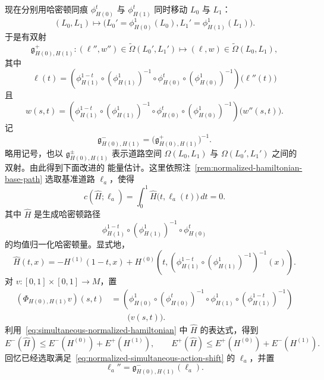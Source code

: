 现在分别用哈密顿同痕 $\phi_{H(0)}^t$ 与 $\phi_{H(1)}^t$ 同时移动
$L_0$ 与 $L_1$：
\[
  (L_0,L_1)
  \longmapsto
  \bigl(
    L_0'=\phi_{H(0)}^1(L_0),
    L_1'=\phi_{H(1)}^1(L_1)
  \bigr).
\]
于是有双射
\[
  \mathfrak g_{H(0),H(1)}^+:
  (\ell'',w'')
  \in\widetilde\Omega(L_0',L_1')
  \longmapsto
  (\ell,w)
  \in\widetilde\Omega(L_0,L_1),
\]
其中
\[
  \ell(t)
  =
  \left(
    \phi_{H(1)}^{1-t}
    \circ(\phi_{H(1)}^1)^{-1}
    \circ\phi_{H(0)}^t
    \circ(\phi_{H(0)}^1)^{-1}
  \right)
  \bigl(\ell''(t)\bigr)
\]
且
\[
  w(s,t)
  =
  \left(
    \phi_{H(1)}^{1-t}
    \circ(\phi_{H(1)}^1)^{-1}
    \circ\phi_{H(0)}^t
    \circ(\phi_{H(0)}^1)^{-1}
  \right)
  \bigl(w''(s,t)\bigr).
\]
记
\[
  \mathfrak g_{H(0),H(1)}^-
  =
  \bigl(\mathfrak g_{H(0),H(1)}^+\bigr)^{-1}.
\]
略用记号，也以 $\mathfrak g_{H(0),H(1)}^\pm$ 表示道路空间
$\Omega(L_0,L_1)$ 与 $\Omega(L_0',L_1')$ 之间的双射。由此得到下面改进的
能量估计。这里依照注~\ref{rem:normalized-hamiltonian-base-path} 选取基准道路
$\ell_a$，使得
\begin{equation}
  c(\widehat H;\ell_a)
  =
  \int_0^1\widehat H\bigl(t,\ell_a(t)\bigr)\,dt
  =
  0.
\label{eq:normalized-simultaneous-action-shift}
\end{equation}
其中 $\widehat H$ 是生成哈密顿路径
\[
  \phi_{H(1)}^{1-t}
  \circ(\phi_{H(1)}^1)^{-1}
  \circ\phi_{H(0)}^t
\]
的均值归一化哈密顿量。显式地，
\begin{equation}
  \widehat H(t,x)
  =
  -H^{(1)}(1-t,x)
  +
  H^{(0)}
  \left(
    t,
    \left(
      \phi_{H(1)}^{1-t}
      \circ(\phi_{H(1)}^1)^{-1}
    \right)^{-1}(x)
  \right).
\label{eq:simultaneous-normalized-hamiltonian}
\end{equation}
对 $v:[0,1]\times[0,1]\to M$，置
\[
  \begin{aligned}
  (\Phi_{H(0),H(1)}v)(s,t)
  &=
  \left(
    \phi_{H(0)}^1
    \circ(\phi_{H(0)}^t)^{-1}
    \circ\phi_{H(1)}^1
    \circ(\phi_{H(1)}^{1-t})^{-1}
  \right)\\
  &\qquad\bigl(v(s,t)\bigr).
  \end{aligned}
\]
利用~\eqref{eq:simultaneous-normalized-hamiltonian} 中 $\widehat H$ 的表达式，得到
\begin{equation}
  E^-(\widehat H)
  \leq
  E^-(H^{(0)})+E^+(H^{(1)}),
  \qquad
  E^+(\widehat H)
  \leq
  E^+(H^{(0)})+E^-(H^{(1)}).
\label{eq:simultaneous-hofer-parts}
\end{equation}
回忆已经选取满足~\eqref{eq:normalized-simultaneous-action-shift} 的 $\ell_a$，并置
\[
  \ell_a''
  =
  \mathfrak g_{H(0),H(1)}^-(\ell_a).
\]

